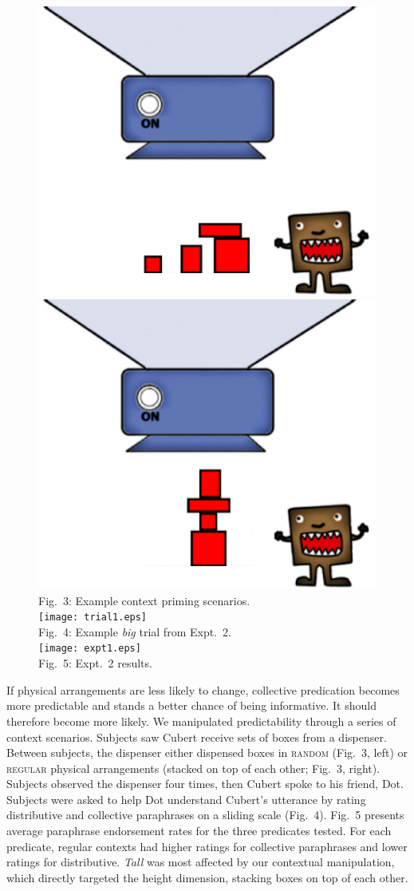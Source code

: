 \documentclass[11pt]{article}
\begin{document}
 \vspace{-13.5pt}\begin{figure}
 	\centering
 	\vspace{-10pt}
 	\includegraphics[width=.49\linewidth]{context13nodolly.eps}
 	\includegraphics[width=.49\linewidth]{context13regnodolly.eps}\\
 	Fig.~3: Example context priming scenarios.\\[5pt]
 	\hspace{-5pt}\texttt{[image: trial1.eps]}\\
 	Fig.~4: Example \emph{big} trial from Expt.~2.\\
 	\mbox{\hspace{-11pt}\texttt{[image: expt1.eps]}}\\
 	\vspace{-8pt}
 	Fig.~5: Expt.~2 results.
 \end{figure}
\noindent If physical arrangements are less likely to change, collective predication becomes more predictable and stands a better chance of being informative. It should therefore become more likely. We manipulated predictability through a series of context scenarios. Subjects saw Cubert receive sets of boxes from a dispenser. Between subjects, the dispenser either dispensed boxes in \textsc{random} (Fig.~3, left) or \textsc{regular} physical arrangements (stacked on top of each other; Fig.~3, right). Subjects observed the dispenser four times, then Cubert spoke to his friend, Dot. Subjects were asked to help Dot understand Cubert's utterance by rating distributive and collective paraphrases on a sliding scale (Fig.~4). Fig.~5 presents average paraphrase endorsement rates for the three predicates tested. For each predicate, regular contexts had higher ratings for collective paraphrases and lower ratings for distributive. \textit{Tall} was most affected by our contextual manipulation, which directly targeted the height dimension, stacking boxes on top of each other. 
\end{document}
